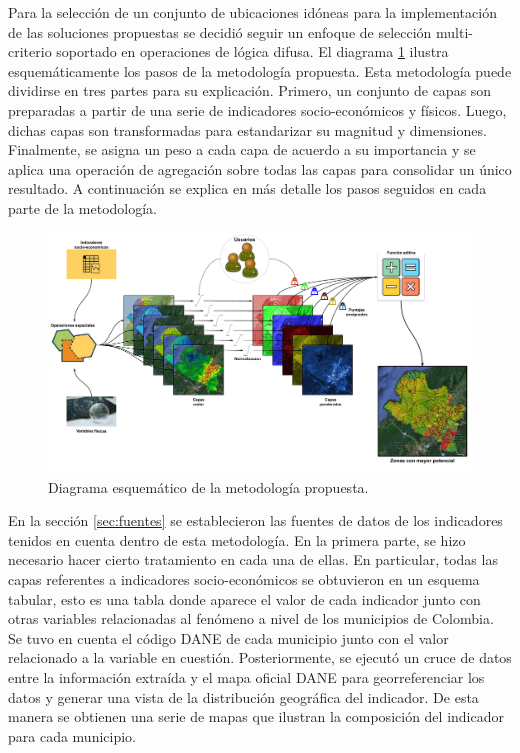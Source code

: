 \label{sec:metodologia}

Para la selección de un conjunto de ubicaciones idóneas para la implementación de las soluciones propuestas se decidió seguir un enfoque de selección 
multi-criterio soportado en operaciones de lógica difusa.  El diagrama \ref{fig:plan} ilustra esquemáticamente los pasos de la metodología propuesta.  Esta 
metodología puede dividirse en tres partes para su explicación.  Primero, un conjunto de capas son preparadas a partir de una serie de indicadores 
socio-económicos y físicos. Luego, dichas capas son transformadas para estandarizar su magnitud y dimensiones.  Finalmente, se asigna un peso a cada capa de 
acuerdo a su importancia y  se aplica una operación de agregación sobre todas las capas para consolidar un único resultado.  A continuación se explica en más 
detalle los pasos seguidos en cada parte de la metodología.

\begin{figure}
    \centering
    \includegraphics[width=1\textwidth]{figures/plan}
    \caption{Diagrama esquemático de la metodología propuesta.}
    \label{fig:plan}
\end{figure}

En la sección \ref{sec:fuentes} se establecieron las fuentes de datos de los indicadores tenidos en cuenta dentro de esta metodología.  En la primera parte, 
se hizo necesario hacer cierto tratamiento en cada una de ellas.  En particular, todas las capas referentes a indicadores socio-económicos 
se obtuvieron en un esquema tabular, esto es una tabla donde aparece el valor de cada indicador junto con otras variables relacionadas al fenómeno a nivel de 
los municipios de Colombia.  Se tuvo en cuenta el código DANE de cada municipio junto con el valor relacionado a la variable en cuestión.  
Posteriormente, se ejecutó un cruce de datos entre la información extraída y el mapa oficial DANE para georreferenciar los datos y generar una vista de la 
distribución geográfica del indicador.  De esta manera se obtienen una serie de mapas que ilustran la composición del indicador para cada municipio.

